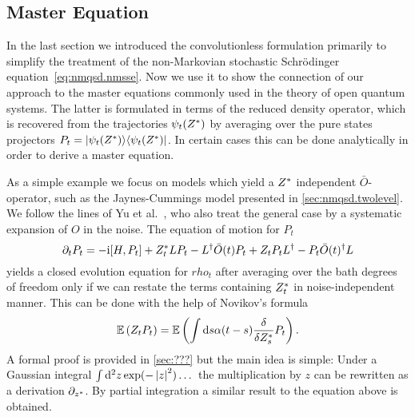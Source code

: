 \subsection{Master Equation}
\label{sub:nmqsd.lin_nmsse.master}

In the last section we introduced the convolutionless formulation primarily to simplify the treatment of the non-Markovian stochastic Schrödinger equation~\ref{eq:nmqsd.nmsse}.
Now we use it to show the connection of our approach to the master equations commonly used in the theory of open quantum systems.
The latter is formulated in terms of the reduced density operator, which is recovered from the trajectories $\psi_t({Z}^*)$ by averaging over the pure states projectors $P_t = | \psi_t({Z}^*) \rangle\langle \psi_t({Z}^*) |$.
In certain cases this can be done analytically in order to derive a master equation.

As a simple example we focus on models which yield a ${Z}^*$ independent $\bar O$-operator, such as the Jaynes-Cummings model presented in \autoref{sec:nmqsd.twolevel}.
We follow the lines of Yu et al.~\cite{YuDiGiSt99_pertubation,YuDiGi00_master}, who also treat the general case by a systematic expansion of $O$ in the noise.
The equation of motion for $P_t$
\begin{equation}
  \partial_t P_t = -\mathrm{i} [H, P_t] + {Z}^*_t L P_t - L^\dagger\bar O(t)P_t + Z_t P_t L^\dagger - P_t \bar O(t)^\dagger L
  \label{eq:nmqsd.pt_eom}
\end{equation}
yields a closed evolution equation for $rho_t$ after averaging over the bath degrees of freedom only if we can restate the terms containing ${Z}^*_t$ in noise-independent manner.
This can be done with the help of Novikov's formula \cite{No65_functionals}
\begin{equation*}
  \E[Z_t P_t] = \E[\intdd s \alpha(t - s) \frac{\delta}{\delta \ZZ_s} P_t].
\end{equation*}
A formal proof is provided in \autoref{sec:???} but the main idea is simple:
Under a Gaussian integral $\intdd^2 z \, \exp(-\abs{z}^2) \dots$ the multiplication by $z$ can be rewritten as a derivation $\partial_{{z}^*}$.
By partial integration a similar result to the equation above is obtained.

